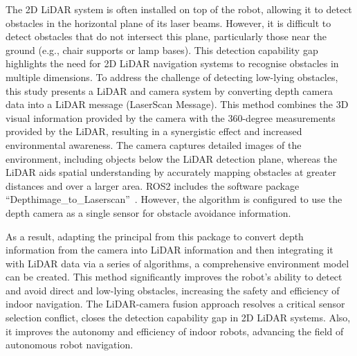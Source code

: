 The 2D LiDAR system is often installed on top of the robot, 
allowing it to detect obstacles in the horizontal plane of its laser beams. 
However, it is difficult to detect obstacles that do not intersect this plane, 
particularly those near the ground (e.g., chair supports or lamp bases). 
This detection capability gap highlights the need for 2D LiDAR navigation systems to recognise obstacles in multiple dimensions. 
To address the challenge of detecting low-lying obstacles, 
this study presents a LiDAR and camera system by converting depth camera data into a LiDAR message (LaserScan Message). 
This method combines the 3D visual information provided by the camera with the 360-degree measurements provided by the LiDAR, 
resulting in a synergistic effect and increased environmental awareness. 
The camera captures detailed images of the environment, 
including objects below the LiDAR detection plane, 
whereas the LiDAR aids spatial understanding by accurately mapping obstacles at greater distances and over a larger area.
ROS2 includes the software package ``Depthimage\_to\_Laserscan''~\cite{rosdepthimage}. 
However, the algorithm is configured to use the depth camera as a single sensor for obstacle avoidance information.

As a result, adapting the principal from this package 
to convert depth information from the camera into LiDAR information 
and then integrating it with LiDAR data via a series of algorithms, 
a comprehensive environment model can be created. 
This method significantly improves the robot's ability to detect and avoid direct 
and low-lying obstacles, increasing the safety and efficiency of indoor navigation.
The LiDAR-camera fusion approach resolves a critical sensor selection conflict, 
closes the detection capability gap in 2D LiDAR systems. 
Also, it improves the autonomy and efficiency of indoor robots, 
advancing the field of autonomous robot navigation.